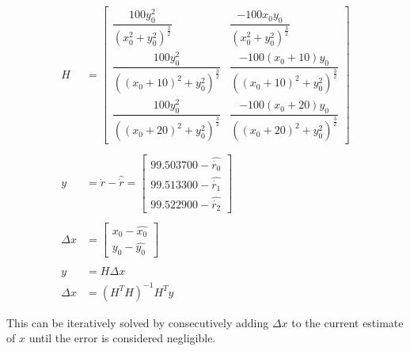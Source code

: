 \documentclass[12pt]{article}
\begin{document}
\begin{adjustwidth}{10mm}{0mm}
    \begin{equation}
      \begin{split}
        H &= \begin{bmatrix}
          \dfrac{100y_0^2}{(x_0^2 + y_0^2)^\frac{3}{2}} &
          \dfrac{-100x_0y_0}{{(x_0^2 + y_0^2)^\frac{3}{2}}} \\[20pt]
          \dfrac{100y_0^2}{((x_0+10)^2 + y_0^2)^\frac{3}{2}} &
          \dfrac{-100(x_0+10)y_0}{{((x_0+10)^2 + y_0^2)^\frac{3}{2}}} \\[20pt]
          \dfrac{100y_0^2}{((x_0+20)^2 + y_0^2)^\frac{3}{2}} &
          \dfrac{-100(x_0+20)y_0}{{((x_0+20)^2 + y_0^2)^\frac{3}{2}}}
        \end{bmatrix} \\ \\
        y &= \dot{r} - \hat{\dot{r}} = 
        \begin{bmatrix}
          99.503700 - \hat{\dot{r_0}} \\[2pt] 
          99.513300 - \hat{\dot{r_1}} \\[2pt]
          99.522900 - \hat{\dot{r_2}} 
        \end{bmatrix} \\ \\
        \Delta x &= \begin{bmatrix}
          x_0 - \hat{x_0} \\[2pt]
          y_0 - \hat{y_0}
        \end{bmatrix} \\
        \\
        y &= H \Delta x \\
        \Delta x &= (H^T H)^{-1} H^T y
      \end{split}
    \end{equation}

    This can be iteratively solved by consecutively adding $\Delta x$ to the 
    current estimate of $x$ until the error is considered negligible.
  \end{adjustwidth}

\end{document}
